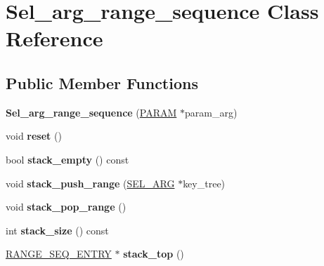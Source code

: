\hypertarget{classSel__arg__range__sequence}{}\section{Sel\+\_\+arg\+\_\+range\+\_\+sequence Class Reference}
\label{classSel__arg__range__sequence}
\subsection*{Public Member Functions}
\begin{DoxyCompactItemize}
\item 
\mbox{\label{classSel__arg__range__sequence_a9868cb4848ecc534d1857a0682f4f0a8}} 
{\bfseries Sel\+\_\+arg\+\_\+range\+\_\+sequence} (\mbox{\hyperlink{classPARAM}{P\+A\+R\+AM}} $\ast$param\+\_\+arg)
\item 
\mbox{\label{classSel__arg__range__sequence_ace28ace924d9852bcbd6fad57861c5a9}} 
void {\bfseries reset} ()
\item 
\mbox{\label{classSel__arg__range__sequence_a5ce41ec93a49a61f25b0c6141196e878}} 
bool {\bfseries stack\+\_\+empty} () const
\item 
\mbox{\label{classSel__arg__range__sequence_aa1cf55ebd94d7a6a489d9f3f98d2f585}} 
void {\bfseries stack\+\_\+push\+\_\+range} (\mbox{\hyperlink{classSEL__ARG}{S\+E\+L\+\_\+\+A\+RG}} $\ast$key\+\_\+tree)
\item 
\mbox{\label{classSel__arg__range__sequence_a59ccee935fd8032350dc66eb0d3aabee}} 
void {\bfseries stack\+\_\+pop\+\_\+range} ()
\item 
\mbox{\label{classSel__arg__range__sequence_adb3cc1a70fc08e0a5f3a583e9008d9af}} 
int {\bfseries stack\+\_\+size} () const
\item 
\mbox{\label{classSel__arg__range__sequence_a77542ea0ad7fe3f3eed041d70e619d07}} 
\mbox{\hyperlink{structst__range__seq__entry}{R\+A\+N\+G\+E\+\_\+\+S\+E\+Q\+\_\+\+E\+N\+T\+RY}} $\ast$ {\bfseries stack\+\_\+top} ()
\end{DoxyCompactItemize}
